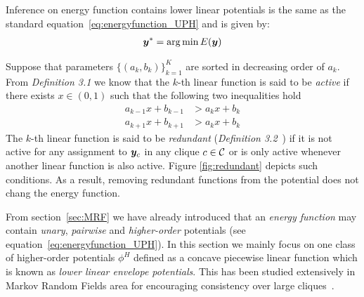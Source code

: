 
Inference on energy function contains lower linear potentials is
the same as the standard equation~\eqref{eq:energyfunction_UPH}
and is given by:
\begin{align}
  \label{eq:min_energy}
  {\bm{y}}^* = \operatorname*{arg\,min}E\!\left({\bm{y}}\right)
\end{align}

Suppose that parameters $\{(a_k, b_k)\}_{k=1}^K$ are sorted in
decreasing order of $a_k$. From \emph{Definition 3.1}
\cite{gouldlearning} we know that the $k$-th linear function is
said to be \emph{active} if there exists $x \in (0, 1)$ such that
the following two inequalities hold
\begin{align}
  a_{k-1} x + b_{k-1} &> a_k x + b_k \nonumber \\
  a_{k+1} x + b_{k+1} &> a_k x + b_k
  \label{eqn:nonred_in_ab}
\end{align}
%
The $k$-th linear function is said to be \emph{redundant}
(\emph{Definition 3.2}~\cite{gouldlearning}) if it is not active
for any assignment to ${\bm{y}}_c$ in any clique $c \in {\mathcal{C}}$ or is only
active whenever another linear function is also active.
Figure \ref{fig:redundant} depicts such conditions. As a
result, removing redundant functions from the potential does not
chang the energy function.


From section~\ref{sec:MRF} we have already introduced that an
\emph{energy function} may contain \emph{unary}, \emph{pairwise}
and \emph{higher-order} potentials (see
equation~\eqref{eq:energyfunction_UPH}). In this section we
mainly focus on one class of higher-order potentials $\phi^H$
defined as a concave piecewise linear function which is known as
\emph{lower linear envelope potentials}. This has been studied
extensively in Markov Random Fields area for encouraging
consistency over large
cliques~\cite{Kohli:CVPR07,Nowozin:2011,Gould:ICML2011}.

